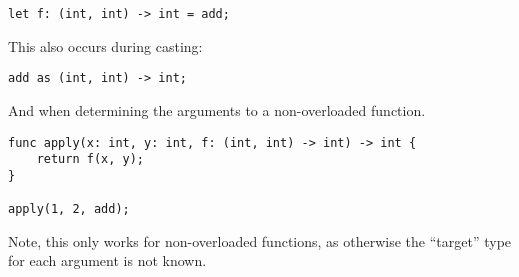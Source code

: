 \begin{lstlisting}[language=CustomLang]
let f: (int, int) -> int = add;
\end{lstlisting}

This also occurs during casting:

\begin{lstlisting}[language=CustomLang]
add as (int, int) -> int;
\end{lstlisting}

And when determining the arguments to a non-overloaded function.

\begin{lstlisting}[language=CustomLang]
func apply(x: int, y: int, f: (int, int) -> int) -> int {
    return f(x, y);
}

apply(1, 2, add);
\end{lstlisting}

Note, this only works for non-overloaded functions, as otherwise the ``target'' type for each argument is not known.
